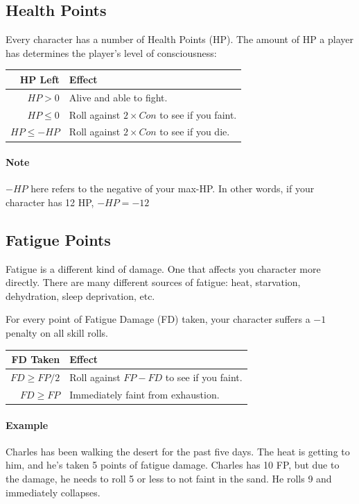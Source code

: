 \subsection{Health Points}
Every character has a number of Health Points (HP).
The amount of HP a player has determines the player's level of consciousness:

\begin{center}
  \begin{tabular}{r | l}
    \textbf{HP Left} & \textbf{Effect} \\\hline
    $HP > 0$         & Alive and able to fight. \\
    $HP \leq 0$      & Roll against $2 \times Con$ to see if you faint. \\
    $HP \leq -HP$    & Roll against $2 \times Con$ to see if you die.
  \end{tabular}
\end{center}

\paragraph{Note} $-HP$ here refers to the negative of your max-HP.
In other words, if your character has 12 HP, $-HP = -12$
  
\subsection{Fatigue Points}
Fatigue is a different kind of damage.
One that affects you character more directly.
There are many different sources of fatigue: heat, starvation, dehydration, sleep deprivation, etc.

For every point of Fatigue Damage (FD) taken, your character suffers a $-1$ penalty on all skill rolls.

\begin{center}
  \begin{tabular}{r | l}
    \textbf{FD Taken} & \textbf{Effect} \\\hline
    $FD \geq FP/2$    & Roll against $FP - FD$ to see if you faint. \\
    $FD \geq FP$      & Immediately faint from exhaustion.
  \end{tabular}
\end{center}

\paragraph{Example} Charles has been walking the desert for the past five days.
The heat is getting to him, and he's taken 5 points of fatigue damage.
Charles has 10 FP, but due to the damage, he needs to roll 5 or less to not faint in the sand.
He rolls 9 and immediately collapses.

